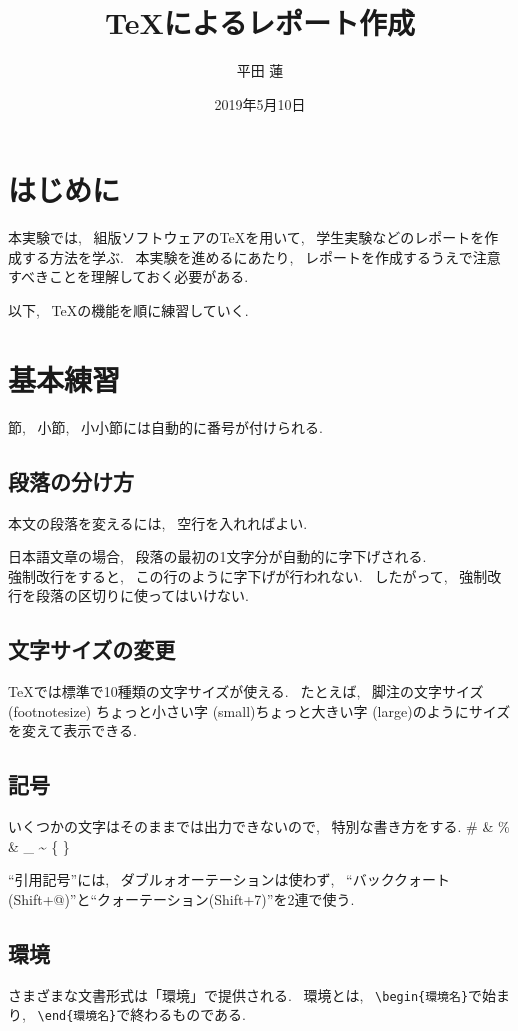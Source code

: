 \documentclass[titlepage]{jarticle}
\title{{\TeX}によるレポート作成}
\author{平田 蓮}
\date{2019年5月10日}
\begin{document}
\maketitle
\section{はじめに}
	本実験では, ~組版ソフトウェアの{\TeX}を用いて, ~学生実験などのレポートを作成する方法を学ぶ.
	~本実験を進めるにあたり, ~レポートを作成するうえで注意すべきことを理解しておく必要がある.

	以下, ~{\TeX}の機能を順に練習していく.

\section{基本練習}
	節, ~小節, ~小小節には自動的に番号が付けられる.
	\subsection{段落の分け方}
		本文の段落を変えるには, ~空行を入れればよい.

		日本語文章の場合, ~段落の最初の1文字分が自動的に字下げされる. \\
		強制改行をすると, ~この行のように字下げが行われない. ~したがって,
		~強制改行を段落の区切りに使ってはいけない.

	\subsection{文字サイズの変更}\label{sec:文字サイズ}
		{\TeX}では標準で10種類の文字サイズが使える. ~たとえば, ~{\footnotesize 脚注の文字サイズ	(footnotesize)}
		{\small ちょっと小さい字 (small)}{\large ちょっと大きい字 (large)}のようにサイズを変えて表示できる.

	\subsection{記号}
		いくつかの文字はそのままでは出力できないので, ~特別な書き方をする. \# \& \% \& \_ \~{} \{ \}

		``引用記号''には, ~ダブルォオーテーションは使わず,
		~``バッククォート(Shift+@)''と``クォーテーション(Shift+7)''を2連で使う.

	\subsection{環境}
		さまざまな文書形式は「環境」で提供される. ~環境とは,
		~\verb|\begin{環境名}|で始まり, ~\verb|\end{環境名}|で終わるものである.
\end{document}
